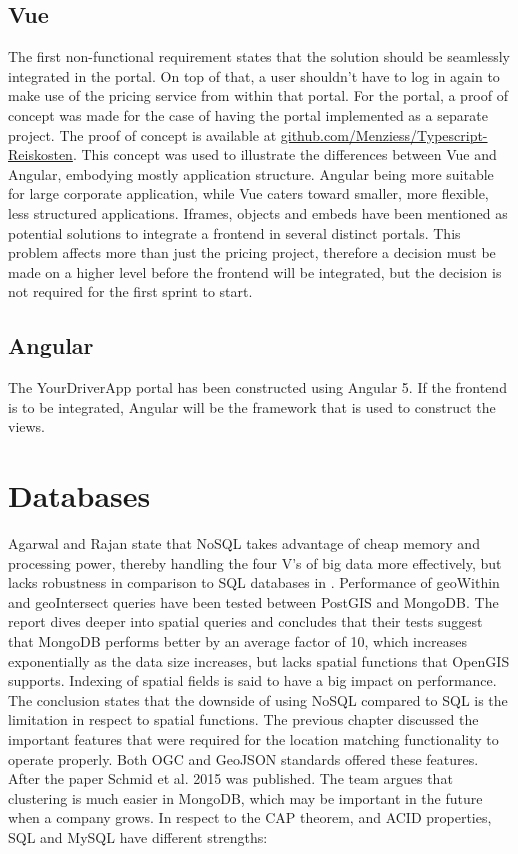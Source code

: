 \subsection{Vue}
The first non-functional requirement states that the solution should be seamlessly integrated in the portal. On top of that, a user shouldn’t have to log in again to make use of the pricing service from within that portal. For the portal, a proof of concept was made for the case of having the portal implemented as a separate project. The proof of concept is available at \url{github.com/Menziess/Typescript-Reiskosten}. This concept was used to illustrate the differences between Vue and Angular, embodying mostly application structure. Angular being more suitable for large corporate application, while Vue caters toward smaller, more flexible, less structured applications. Iframes, objects and embeds have been mentioned as potential solutions to integrate a frontend in several distinct portals. This problem affects more than just the pricing project, therefore a decision must be made on a higher level before the frontend will be integrated, but the decision is not required for the first sprint to start.

\subsection{Angular}
The YourDriverApp portal has been constructed using Angular 5. If the frontend is to be integrated, Angular will be the framework that is used to construct the views.

%
\section{Databases}
Agarwal and Rajan state that NoSQL takes advantage of cheap memory and processing power, thereby handling the four V’s of big data more effectively, but lacks robustness in comparison to SQL databases in \cite{AGS}. Performance of geoWithin and geoIntersect queries have been tested between PostGIS and MongoDB. The report dives deeper into spatial queries and concludes that their tests suggest that MongoDB performs better by an average factor of 10, which increases exponentially as the data size increases, but lacks spatial functions that OpenGIS supports. Indexing of spatial fields is said to have a big impact on performance. The conclusion states that the downside of using NoSQL compared to SQL is the limitation in respect to spatial functions. The previous chapter discussed the important features that were required for the location matching functionality to operate properly. Both OGC and GeoJSON standards offered these features. After the paper Schmid et al. 2015 \cite{SCS} was published. The team argues that clustering is much easier in MongoDB, which may be important in the future when a company grows. In respect to the CAP theorem, and ACID properties, SQL and MySQL have different strengths:

